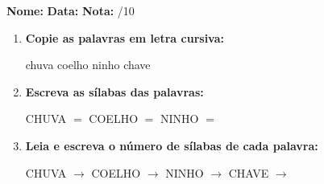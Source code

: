 \begin{exercicio}



\noindent\textbf{Nome:} \underline{\hspace{3.2cm}} \quad \textbf{Data:} \underline{\hspace{1.6cm}} \quad \textbf{Nota:} \underline{\hspace{0.9cm}}/10


\begin{enumerate}

  \item \textbf{Copie as palavras em letra cursiva:}
  \begin{center}
  chuva \quad coelho \quad ninho \quad chave
  \end{center}
  \begin{center}
  \underline{\hspace{2.4cm}} \quad \underline{\hspace{2.4cm}} \quad \underline{\hspace{2.4cm}} \quad \underline{\hspace{2.4cm}}
  \end{center}

  \item \textbf{Escreva as sílabas das palavras:}
  \begin{center}
  CHUVA $=$ \underline{\hspace{1.5cm}} \underline{\hspace{1.5cm}} \quad COELHO $=$ \underline{\hspace{1.5cm}} \underline{\hspace{1.5cm}} \quad NINHO $=$ \underline{\hspace{1.5cm}} \underline{\hspace{1.5cm}}
  \end{center}

  \item \textbf{Leia e escreva o número de sílabas de cada palavra:}
  \begin{center}
  CHUVA $\rightarrow$ \underline{\hspace{0.9cm}} \quad COELHO $\rightarrow$ \underline{\hspace{0.9cm}} \quad NINHO $\rightarrow$ \underline{\hspace{0.9cm}} \quad CHAVE $\rightarrow$ \underline{\hspace{0.9cm}}
  \end{center}


\end{enumerate}
\end{exercicio}
